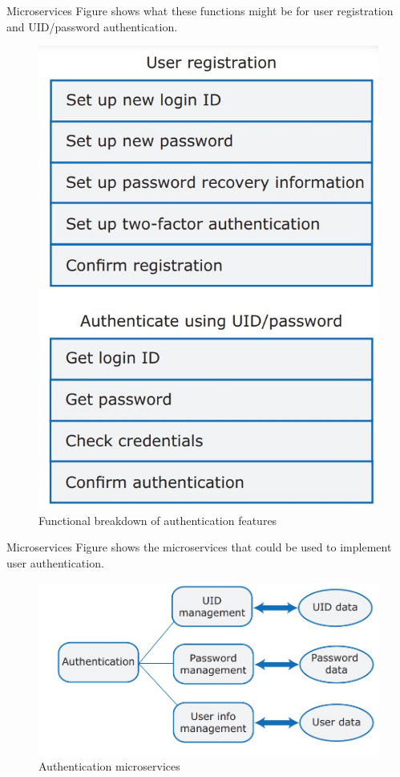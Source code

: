 \documentclass{beamer}
\begin{document}
\begin{frame}{Microservices}
	Figure shows what these functions might be for 
	user registration and UID/password authentication.
	\begin{figure}
	\includegraphics[scale=.3]{img/m5_10}
	\caption{Functional breakdown of authentication features}
\end{figure}
\end{frame}
\begin{frame}{Microservices}
Figure shows the microservices that could be used to 
implement user authentication.
	\begin{figure}
		\includegraphics[scale=.3]{img/m5_11}
		\caption{Authentication microservices}
	\end{figure}
\end{frame}
\end{document}
